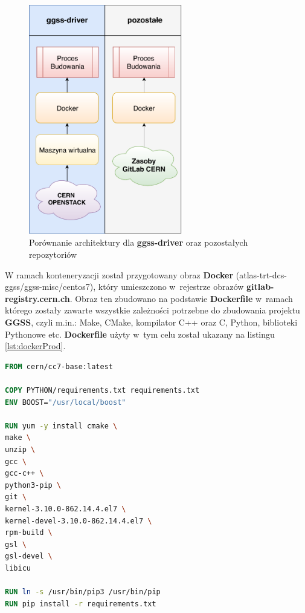 \newpage

\begin{figure}[H]
\centering
\includegraphics[width=0.6\textwidth]{res/buildComp}
\caption{Porównanie architektury dla \textbf{ggss-driver} oraz pozostałych repozytoriów}
\label{fig:buildComp}
\end{figure}

\newpage

W ramach konteneryzacji został przygotowany obraz \textbf{Docker} (atlas-trt-dcs-ggss/ggss-misc/centos7), który umieszczono w~rejestrze obrazów \textbf{gitlab-registry.cern.ch}. Obraz ten zbudowano na podstawie \textbf{Dockerfile} w~ramach którego zostały zawarte wszystkie zależności potrzebne do zbudowania projektu \textbf{GGSS}, czyli m.in.: Make, CMake, kompilator C++ oraz C, Python, biblioteki Pythonowe etc. \textbf{Dockerfile} użyty w~tym celu został ukazany na listingu \ref{lst:dockerProd}.

\begin{lstlisting}[language=Dockerfile, caption={\textbf{Dockerfile} dla projektu \textbf{GGSS}}, label={lst:dockerProd}]
FROM cern/cc7-base:latest

COPY PYTHON/requirements.txt requirements.txt
ENV BOOST="/usr/local/boost"

RUN yum -y install cmake \
make \
unzip \
gcc \
gcc-c++ \
python3-pip \
git \
kernel-3.10.0-862.14.4.el7 \
kernel-devel-3.10.0-862.14.4.el7 \
rpm-build \
gsl \
gsl-devel \
libicu

RUN ln -s /usr/bin/pip3 /usr/bin/pip
RUN pip install -r requirements.txt
\end{lstlisting}

